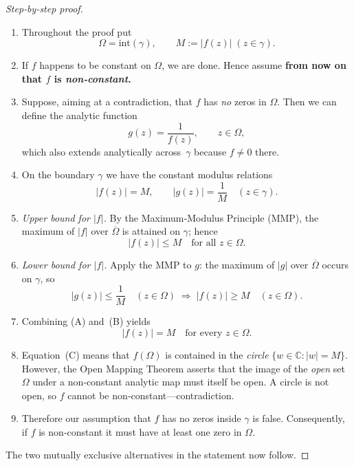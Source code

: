 \documentclass[12pt]{article}
\theoremstyle{definition} %
\theoremstyle{plain} %
\begin{document}
  \begin{proof}[Step‑by‑step proof]
  \begin{enumerate}
  \item
    Throughout the proof put
    \[
       \Omega=\text{int}(\gamma), \qquad M:=|f(z)|\;(z\in\gamma).
    \]
  
  \item
    If $f$ happens to be constant on $\Omega$, we are done.  
    Hence assume \textbf{from now on that $f$ is \emph{non‑constant}.}
  
  \item
    Suppose, aiming at a contradiction, that $f$ has \emph{no} zeros in $\Omega$.
    Then we can define the analytic function
    \[
       g(z)=\frac{1}{f(z)}, \qquad z\in\Omega,
    \]
    which also extends analytically across~$\gamma$ because $f\neq0$ there.
  
  \item
    On the boundary $\gamma$ we have the constant modulus relations
    \[
      |f(z)|=M, \qquad |g(z)|=\frac1M \quad(z\in\gamma).
    \]
  
  \item
    \emph{Upper bound for $|f|$.}
    By the Maximum‑Modulus Principle (MMP), the maximum of $|f|$ over
    $\overline{\Omega}$ is attained on $\gamma$; hence
    \[
        |f(z)|\le M \quad\text{for all } z\in\Omega. \tag{A}
    \]
  
  \item
    \emph{Lower bound for $|f|$.}
    Apply the MMP to $g$: the maximum of $|g|$ over $\overline{\Omega}$
    occurs on $\gamma$, so
    \[
        |g(z)|\le\frac1M \quad(z\in\Omega)
        \;\Longrightarrow\;
        |f(z)|\ge M \quad(z\in\Omega). \tag{B}
    \]
  
  \item
    Combining (A) and~(B) yields
    \[
        |f(z)| = M \quad\text{for every } z\in\Omega. \tag{C}
    \]
  
  \item
    Equation~(C) means that $f(\Omega)$ is contained in the \emph{circle}
    $\{w\in\mathbb{C}:|w|=M\}$.
    However, the Open Mapping Theorem asserts that the image of the \emph{open}
    set $\Omega$ under a non‑constant analytic map must itself be open.
    A circle is not open, so $f$ cannot be non‑constant—contradiction.
  
  \item
    Therefore our assumption that $f$ has no zeros inside $\gamma$ is false.
    Consequently, if $f$ is non‑constant it must have at least one zero in
    $\Omega$.
  \end{enumerate}
  The two mutually exclusive alternatives in the statement now follow.
  \end{proof}
\end{document}
